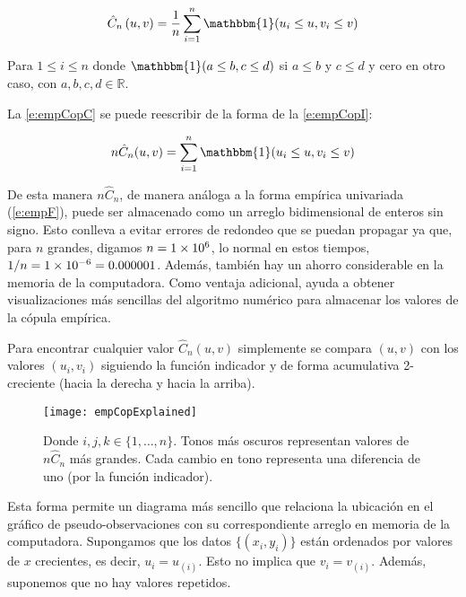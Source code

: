 \begin{equation}
	{\hat{C}}_{n}\left( u,v \right) = \frac{1}{n}\sum_{i = 1}^{n}{\mathbbm{1}(u_{i} \leq u,v_{i} \leq v)}
	\label{e:empCopC} %
\end{equation}

\noindent
Para \(1 \leq i \leq n\) donde
\(\mathbbm{1}(a \leq b,c \leq d)\) si \(a \leq b\) y \(c \leq d\) y cero en otro caso, con \(a,b,c,d\mathbb{\in R}\).

La \autoref{e:empCopC} se puede reescribir de la forma de la \autoref{e:empCopI}:

\begin{equation}
	n\hat{C}_{n}( u,v) =
	\sum_{i = 1}^{n}
	\mathbbm{1}(u_{i} \leq u,v_{i} \leq v)
	\label{e:empCopI} %
\end{equation}

De esta manera $n\hat{C}_n$, de manera an\'aloga a la forma emp\'irica univariada (\autoref{e:empF}), puede ser almacenado como un arreglo bidimensional de enteros sin signo.
Esto conlleva a evitar errores de redondeo que se puedan propagar ya que, para $n$ grandes, digamos $n=1\times 10^{6}$, lo normal en estos tiempos, $1/n=1\times 10^{-6}=0.000001$.
Adem\'as, tambi\'en hay un ahorro considerable en la memoria de la computadora. Como ventaja adicional, ayuda a obtener visualizaciones m\'as sencillas del algoritmo num\'erico para almacenar los valores de la c\'opula emp\'irica.

Para encontrar cualquier valor $\hat{C}_n(u,v)$ simplemente se compara $(u,v)$ con los valores $(u_i, v_i)$ siguiendo la funci\'on indicador y de forma acumulativa 2-creciente (hacia la derecha y hacia la arriba).

\begin{figure}
	\centering
	\texttt{[image: empCopExplained]}
	\caption{Donde $i,j,k \in \{1, \ldots,n\}$. Tonos m\'as oscuros representan valores de $n\hat{C}_n$ m\'as grandes. Cada cambio en tono representa una diferencia de uno (por la funci\'on indicador).}
	\label{f:empCopExplained}
\end{figure}

Esta forma permite un diagrama m\'as sencillo que relaciona la ubicaci\'on en el gr\'afico de pseudo-observaciones con su correspondiente arreglo en memoria de la computadora.
Supongamos que los datos $\{(x_i, y_i)\}$ est\'an ordenados por valores de $x$ crecientes, es decir, $u_i = u_{(i)}$. Esto no implica que $v_i = v_{(i)}$.
Adem\'as, suponemos que no hay valores repetidos.

